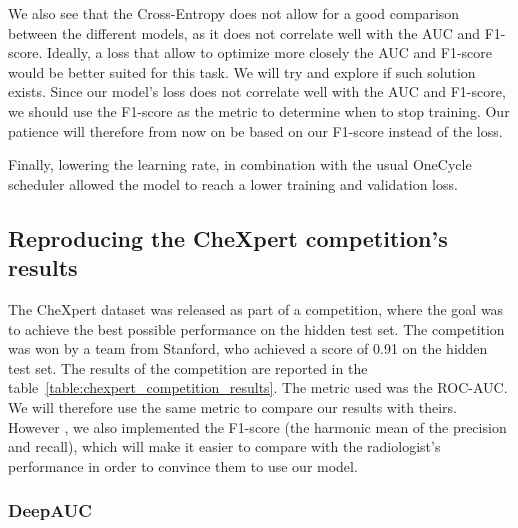 \documentclass[11pt]{article}
\begin{document}
            We also see that the Cross-Entropy does not allow for a good comparison between the different models, as it does not correlate well with the AUC and F1-score.
            Ideally, a loss that allow to optimize more closely the AUC and F1-score would be better suited for this task. We will try and explore if such solution exists.
            Since our model's loss does not correlate well with the AUC and F1-score, we should use the F1-score as the metric to determine when to stop training. Our patience
            will therefore from now on be based on our F1-score instead of the loss.

            Finally, lowering the learning rate, in combination with the usual OneCycle scheduler allowed the model to reach a lower training and validation loss.


        \subsection{Reproducing the CheXpert competition's results}

            The CheXpert dataset was released as part of a competition, where the goal was to achieve the best possible performance on the hidden test set. The competition was won by a team from Stanford, who achieved a score of 0.91 on the hidden test set. The results of the competition are reported in the table~\ref{table:chexpert_competition_results}.
            The metric used was the ROC-AUC. We will therefore use the same metric to compare our results with theirs. However , we also implemented the
            F1-score (the harmonic mean of the precision and recall), which will make it easier to compare with the radiologist's performance
            in order to convince them to use our model.


        \subsubsection{DeepAUC~\cite{DeepAUC}}
\end{document}
